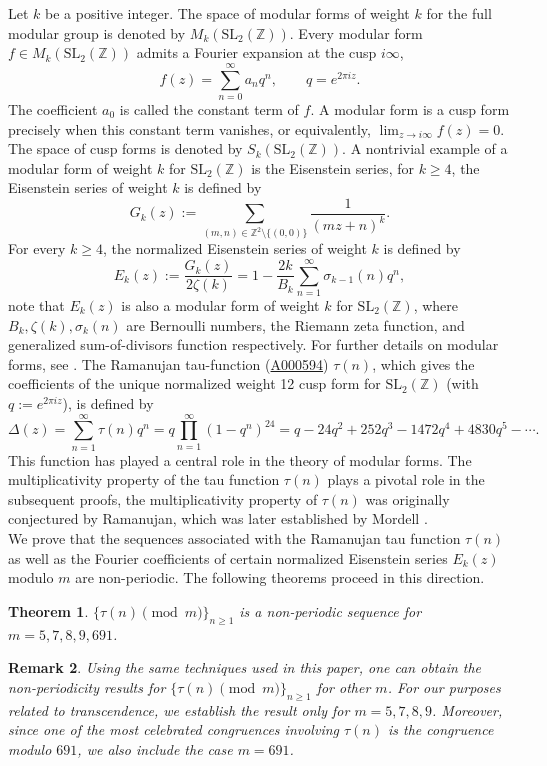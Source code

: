 \documentclass[12pt,reqno]{amsart}
\newtheorem{theorem}{Theorem}[section]
\newtheorem{remark}[theorem]{Remark}
\begin{document}
 Let $k$ be a positive integer. The space of modular forms of weight $k$ for the full modular group is denoted by $M_k(\mathrm{SL}_2(\mathbb{Z}))$. Every modular form $f \in M_k(\mathrm{SL}_2(\mathbb{Z}))$ admits a Fourier expansion at the cusp $i\infty$,
$$f(z) = \sum_{n=0}^{\infty} a_n q^n, \qquad q = e^{2\pi i z}.$$
The coefficient $a_0$ is called the constant term of $f$. A modular form is
a cusp form precisely when this constant term vanishes, or equivalently, $\lim_{z\to i\infty} f(z)=0$.
The space of cusp forms is denoted by $S_k(\mathrm{SL}_2(\mathbb{Z}))$. A nontrivial example of a modular form of weight $k$ for $\mathrm{SL}_2(\mathbb{Z})$ is the Eisenstein series, for $k \geq 4$, the Eisenstein series of weight $k$ is defined by 
$$G_k(z):= \sum_{(m,n)\in \mathbb{Z}^2 \setminus \{(0,0)\}}
    \frac{1}{(mz+n)^k}.$$
For every $k \ge 4$, the normalized Eisenstein series of weight $k$ is defined by
$$E_k(z):= \frac{G_k(z)}{2\zeta(k)}=1-\frac{2k}{B_k}\sum_{n=1}^{\infty} \sigma_{k-1}(n)q^n,$$
note that $E_k(z)$ is also a modular form of weight $k$ for $\mathrm{SL}_2(\mathbb{Z})$, where $B_k, \zeta(k),\sigma_{k}(n)$ are Bernoulli numbers, the Riemann zeta function, and generalized sum-of-divisors function respectively. For further details on modular forms, see \cite{murty}. The Ramanujan tau-function \cite{new1,new2} (\href{https://oeis.org/A000594}{A000594}) $\tau(n)$, which gives the coefficients of the unique normalized weight 12 cusp form for $\mathrm{SL}_2(\mathbb{Z})$ (with $q := e^{2\pi i z}$), is defined by
$$\Delta(z) = \sum_{n=1}^{\infty} \tau(n) q^n
= q \prod_{n=1}^{\infty} (1-q^n)^{24}
= q-24q^2+252q^3-1472q^4+4830q^5-\cdots.$$
This function has played a central role in the theory of modular forms. The multiplicativity property of the tau function $\tau(n)$ plays a pivotal role in the subsequent proofs, the multiplicativity property of $\tau(n)$ was originally conjectured by Ramanujan, which was later established by Mordell \cite{Mordell}.\\
We prove that the sequences associated with the Ramanujan tau function $\tau(n)$ as well as the Fourier coefficients of certain normalized Eisenstein series $E_k(z)$ modulo $m$ are non-periodic. The following theorems proceed in this direction.

\begin{theorem}\label{theorem tau}
$\{\tau(n) \pmod{m}\}_{n\geq1}$ is a non-periodic sequence for $m=5,7,8,9,691$.
\end{theorem}
\begin{remark}
Using the same techniques used in this paper, one can obtain the non-periodicity results for $\{\tau(n) \pmod{m}\}_{n\geq1}$ for other $m$. For our purposes related to transcendence, we establish the result only for $m=5,7,8,9$. Moreover, since one of the most celebrated congruences involving $\tau(n)$ is the congruence modulo $691$, we also include the case $m=691$.
\end{remark}
\end{document}
